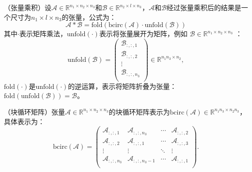 \begin{definition}\label{def:tprod}
（张量乘积\cite{18}）设$\mathcal{A}\in \mathbb{R}^{n_1\times n_2 \times n_3}$和$\mathcal{B}\in \mathbb{R}^{n_2\times l \times n_3 }$，$ \mathcal{A} $和$ \mathcal{B} $经过张量乘积后的结果是一个尺寸为$n_1\times l \times n_3$的张量，公式为：
	\begin{equation}
		\mathcal{A}\ast\mathcal{B}=\mathrm{fold}(\mathrm{bcirc}(\mathcal{A})\cdot \mathrm{unfold}(\mathcal{B}))
	\end{equation}
其中$\cdot$表示矩阵乘法，$	\mathrm{unfold}(\cdot)$表示将张量展开为矩阵，例如 $ \mathcal{B}\in \mathbb{R}^{n_1\times n_2\times n_3} $ ：\begin{equation}
\mathrm{unfold}(\mathcal{B})=\left(
\begin{array}{c}
	\mathcal{B}_{:,:,1} \\
	\mathcal{B}_{:,:,2} \\
	\vdots \\
	\mathcal{B}_{:,:,n_3} \\
\end{array}
\right)\in \mathbb{R}^{n_1n_3  \times n_2},  \end{equation} $\mathrm{fold}(\cdot)$是$	\mathrm{unfold}(\cdot)$的逆运算，表示将矩阵折叠为张量：$\mathrm{fold}(\mathrm{unfold}(\mathcal{B}))=\mathcal{B}$。
\end{definition}

\begin{definition}
（块循环矩阵\cite{18}）张量$\mathcal{A}\in \mathbb{R}^{n_1\times n_2 \times n_3}$的块循环矩阵表示为$ \mathrm{bcirc} (\mathcal{A}) \in \mathbb{R}^{n_1n_3\times n_2n_3}$，具体表示为：\begin{equation}\mathrm{bcirc}(\mathcal{A})=\left(
\begin{array}{cccc}
	\mathcal{A}_{:,:,1}& \mathcal{A}_{:,:,n_3}  & \cdots & \mathcal{A}_{:,:,2}  \\
	\mathcal{A}_{:,:,2} &  \mathcal{A}_{:,:,1}  & \cdots&  \mathcal{A}_{:,:,3} \\
	\vdots  & \vdots & \ddots & \vdots \\
	\mathcal{A}_{:,:,n_3}  & \mathcal{A}_{:,:,n_3-1}   & \cdots &  	 \mathcal{A}_{:,:,1}  \\
\end{array}                               \right).	\end{equation}
\end{definition}

